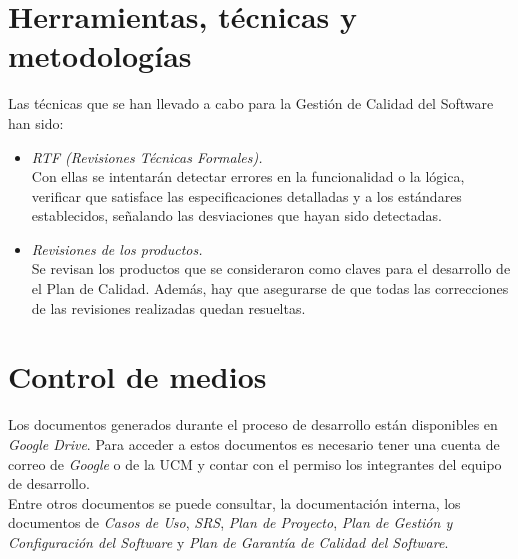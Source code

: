 \documentclass[11pt, a4paper, twoside, titlepage]{article}
\begin{document}
	\section{Herramientas, técnicas y metodologías} %
		Las técnicas que se han llevado a cabo para la Gestión de Calidad del Software han sido:

		\begin{itemize}
			\item \textit{RTF (Revisiones Técnicas Formales).} \\
				Con ellas se intentarán detectar errores en la funcionalidad o la lógica, verificar que satisface las especificaciones detalladas y a los estándares establecidos, señalando las desviaciones que hayan sido detectadas.
			\item \textit{Revisiones de los productos.} \\
				Se revisan los productos que se consideraron como claves para el desarrollo de el Plan de Calidad. Además, hay que asegurarse de que todas las correcciones de las revisiones realizadas quedan resueltas.
		 \end{itemize}

	\section{Control de medios} %
		Los documentos generados durante el proceso de desarrollo están disponibles en \textit{Google Drive}. Para acceder a estos documentos es necesario tener una cuenta de correo de \textit{Google} o de la UCM %
 y contar con el permiso los integrantes del equipo de desarrollo.\\

		Entre otros documentos se puede consultar, la documentación interna, los documentos de \textit{Casos de Uso}, \textit{SRS}, \textit{Plan de Proyecto}, \textit{Plan de Gestión y Configuración del Software} y \textit{Plan de Garantía de Calidad del Software}.
\end{document}
